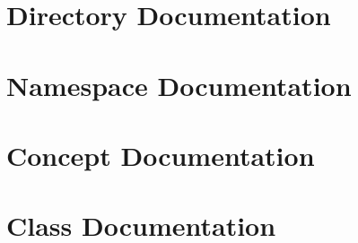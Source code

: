 \documentclass[twoside]{book}
\newcommand{\+}{\discretionary{\mbox{\scriptsize$\hookleftarrow$}}{}{}}
\begin{document}
\chapter{Directory Documentation}













\chapter{Namespace Documentation}





\chapter{Concept Documentation}






\chapter{Class Documentation}

































\end{document}
